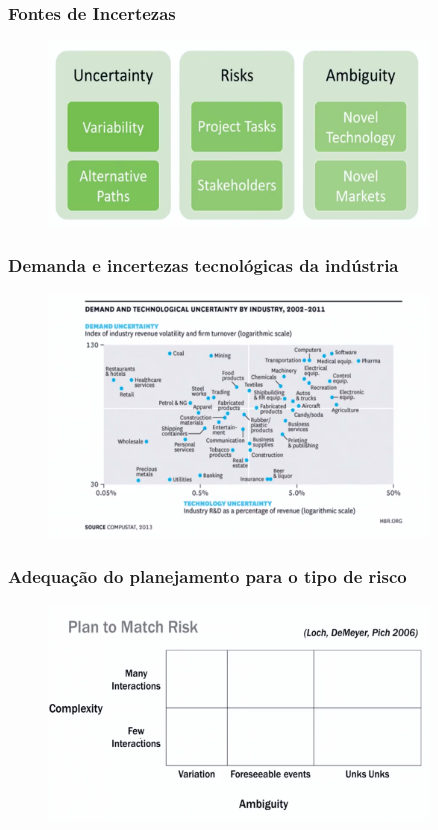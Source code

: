 \begin{frame}
 \frametitle{Fontes de Incertezas}
  \begin{figure}
   \centering
   \includegraphics[width = 0.9\textwidth]{figs/fig2.png}
  \end{figure}
\end{frame}

\begin{frame}
 \frametitle{Demanda e incertezas tecnológicas da indústria}
  \begin{figure}
   \centering
   \includegraphics[width = 0.9\textwidth]{figs/fig3.png}
  \end{figure}
\end{frame}


\begin{frame}
 \frametitle{Adequação do planejamento para o tipo de risco}
  \begin{figure}
   \centering
   \includegraphics[width = 0.9\textwidth]{figs/fig4.png}
  \end{figure}
\end{frame}

